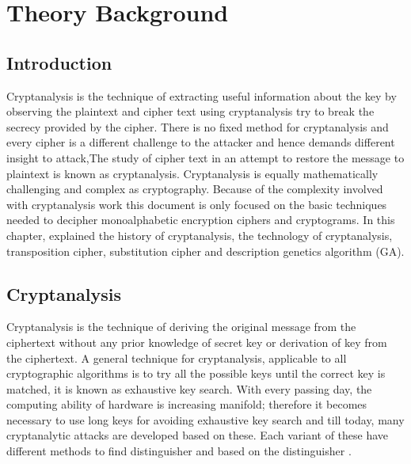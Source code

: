 \chapter{Theory Background}
\section{Introduction}
Cryptanalysis is the technique of extracting useful information about the key by observing the plaintext and cipher text using cryptanalysis try to break the secrecy provided by the cipher. There is no fixed method for cryptanalysis and every cipher is a different challenge to the attacker and hence demands different insight to attack\cite{jha2011cryptanalysis},The study of cipher text in an attempt to restore the message to plaintext is known as cryptanalysis. Cryptanalysis is equally mathematically challenging and complex as cryptography. Because of the complexity involved with cryptanalysis work this document is only focused on the basic techniques needed to decipher monoalphabetic encryption ciphers and cryptograms\cite{smith2001basic}.
In this chapter, explained the history of cryptanalysis, the technology of cryptanalysis, transposition cipher, substitution cipher and description genetics algorithm (GA).

\section{Cryptanalysis}
Cryptanalysis is the technique of deriving the original
message from the ciphertext without any prior knowledge of
secret key or derivation of key from the ciphertext. A general
technique for cryptanalysis, applicable to all cryptographic
algorithms is to try all the possible keys until the correct key
is matched, it is known as exhaustive key search. With every
passing day, the computing ability of hardware is increasing
manifold; therefore it becomes necessary to use long keys for
avoiding exhaustive key search \cite{bokhari2012cryptanalysis} and till today, many cryptanalytic attacks are developed based on these. Each variant of these have different methods to find distinguisher and
based on the distinguisher \cite{khurana2015variants}.


